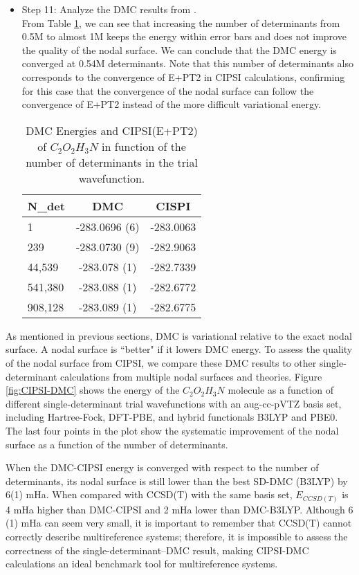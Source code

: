 \begin{itemize}
\item Step 11: Analyze the DMC results from \qmcpack. \\
From Table \ref{TAB:CIPSI-DMC}, we can see that increasing the number
of determinants from 0.5M to almost 1M keeps the energy
within error bars and does not improve the quality of the nodal
surface. We can conclude that the DMC energy is converged at 0.54M
determinants. Note that this number of determinants
also corresponds to the convergence of E+PT2 in CIPSI calculations,
confirming for this case that the convergence of the nodal surface can
follow the convergence of E+PT2 instead of the more difficult
variational energy.


\begin{table}[t]
\centering
\caption{DMC Energies and CIPSI(E+PT2) of $C_2O_2H_3N$ in function of the number of determinants in the trial wavefunction.}
\label{TAB:CIPSI-DMC}
\begin{tabular}{l|c|c}
\hline 
N\_det & DMC& CISPI\\
\hline
1 & -283.0696 (6)&-283.0063\\
239 & -283.0730 (9)&-282.9063\\
44,539 & -283.078 (1)&-282.7339\\
541,380 & -283.088 (1)&-282.6772\\
908,128& -283.089  (1)&-282.6775\end{tabular}
\end{table}

\end{itemize}

As mentioned in previous sections, DMC is variational relative to the
exact nodal surface. A nodal surface is ``better" if it lowers DMC
energy. To assess the quality of the nodal surface from CIPSI, we
compare these DMC results to other single-determinant calculations
from multiple nodal surfaces and theories. Figure \ref{fig:CIPSI-DMC}
shows the energy of the $C_2O_2H_3N$ molecule as a function of
different single-determinant trial wavefunctions with an
aug-cc-pVTZ basis set, including Hartree-Fock, DFT-PBE, and hybrid
functionals B3LYP and PBE0. The last four points in the plot show the
systematic improvement of the nodal surface as a function of the
number of determinants. 

When the DMC-CIPSI energy is converged with respect to the number of
determinants, its nodal surface is still lower than the best SD-DMC
(B3LYP) by 6(1) mHa. When compared with CCSD(T) with the same basis set,
$E_{CCSD(T)}$ is 4 mHa higher than DMC-CIPSI and 2 mHa lower than
DMC-B3LYP. Although 6 (1) mHa can seem very small, it is important to remember that CCSD(T) cannot correctly describe multireference systems; therefore, it is impossible to assess the
correctness of the single-determinant--DMC result, making CIPSI-DMC calculations an
ideal benchmark tool for multireference systems.

